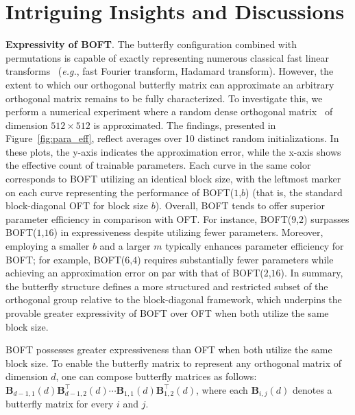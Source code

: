 \section{Intriguing Insights and Discussions}

\textbf{Expressivity of BOFT}. The butterfly configuration combined with permutations is capable of exactly representing numerous classical fast linear transforms~\cite{dao2019learning,dao2019kaleidoscope} (\emph{e.g.}, fast Fourier transform, Hadamard transform). However, the extent to which our orthogonal butterfly matrix can approximate an arbitrary orthogonal matrix remains to be fully characterized. To investigate this, we perform a numerical experiment where a random dense orthogonal matrix~\cite{anderson1987generation} of dimension $512\times 512$ is approximated. The findings, presented in Figure~\ref{fig:para_eff}, reflect averages over 10 distinct random initializations. In these plots, the y-axis indicates the approximation error, while the x-axis shows the effective count of trainable parameters. Each curve in the same color corresponds to BOFT utilizing an identical block size, with the leftmost marker on each curve representing the performance of BOFT($1$,$b$) (that is, the standard block-diagonal OFT for block size $b$). Overall, BOFT tends to offer superior parameter efficiency in comparison with OFT. For instance, BOFT($9$,$2$) surpasses BOFT($1$,$16$) in expressiveness despite utilizing fewer parameters. Moreover, employing a smaller $b$ and a larger $m$ typically enhances parameter efficiency for BOFT; for example, BOFT($6$,$4$) requires substantially fewer parameters while achieving an approximation error on par with that of BOFT($2$,$16$). In summary, the butterfly structure defines a more structured and restricted subset of the orthogonal group relative to the block-diagonal framework, which underpins the provable greater expressivity of BOFT over OFT when both utilize the same block size.

\begin{theorem}\label{thm:exp_boft}
    BOFT possesses greater expressiveness than OFT when both utilize the same block size. To enable the butterfly matrix to represent any orthogonal matrix of dimension $d$, one can compose butterfly matrices as follows: $\bm{B}_{d-1,1}(d)\bm{B}^\top_{d-1,2}(d)\cdots\bm{B}_{1,1}(d)\bm{B}^\top_{1,2}(d)$, where each $\bm{B}_{i,j}(d)$ denotes a butterfly matrix for every $i$ and $j$.
\end{theorem}

